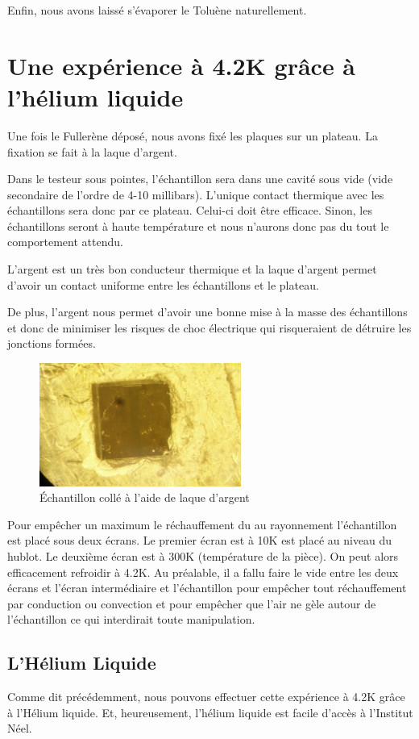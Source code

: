 Enfin, nous avons laissé s'évaporer le Toluène naturellement.
\section{Une expérience à 4.2K grâce à l'hélium liquide}
Une fois le Fullerène déposé, nous avons fixé les plaques sur un plateau. La fixation se fait à la laque d'argent.

Dans le testeur sous pointes, l'échantillon sera dans une cavité sous vide (vide secondaire de l'ordre de 4-10 millibars). L'unique contact thermique avec les échantillons sera donc par ce plateau. Celui-ci doit être efficace. Sinon, les échantillons seront à haute température et nous n'aurons donc pas du tout le comportement attendu.

L'argent est un très bon conducteur thermique et la laque d'argent permet d'avoir un contact uniforme entre les échantillons et le plateau.

De plus, l'argent nous permet d'avoir une bonne mise à la masse des échantillons et donc de minimiser les risques de choc électrique qui risqueraient de détruire les jonctions formées.
\begin{figure}[h]
    \begin{center}
        \includegraphics[width=250px]{Images/PhotoPlaqueTransistors}
        \caption{Échantillon collé à l'aide de laque d'argent}
        \label{fig:}
    \end{center}
\end{figure}

Pour empêcher un maximum le réchauffement du au rayonnement l'échantillon est placé sous deux écrans. Le premier  écran est à 10K est placé au niveau du hublot. Le deuxième écran est à 300K (température de la pièce). On peut alors efficacement refroidir à 4.2K. Au préalable, il a fallu faire le vide entre les deux écrans et l'écran intermédiaire et l'échantillon pour empêcher tout réchauffement par conduction ou convection et  pour empêcher que l'air ne gèle autour de l'échantillon ce qui interdirait toute manipulation.
\subsection{L'Hélium Liquide}
Comme dit précédemment, nous pouvons effectuer cette expérience à 4.2K grâce à l'Hélium liquide. Et, heureusement, l'hélium liquide est facile d'accès à l'Institut Néel.

